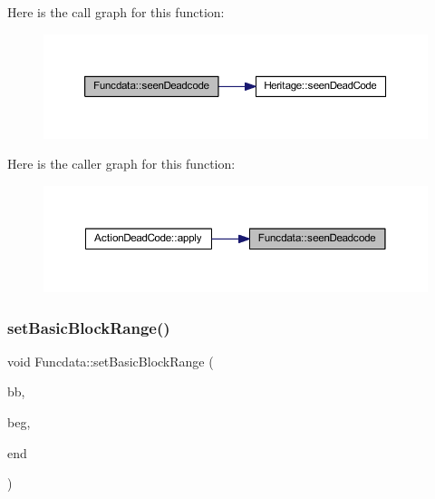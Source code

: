 Here is the call graph for this function\+:
\nopagebreak
\begin{figure}[H]
\begin{center}
\leavevmode
\includegraphics[width=350pt]{class_funcdata_adc0c8b4dab63367913749e68fbd33789_cgraph}
\end{center}
\end{figure}
Here is the caller graph for this function\+:
\nopagebreak
\begin{figure}[H]
\begin{center}
\leavevmode
\includegraphics[width=350pt]{class_funcdata_adc0c8b4dab63367913749e68fbd33789_icgraph}
\end{center}
\end{figure}
\mbox{\label{class_funcdata_a15885a8369e2c43c8c7883a4fabd533e}} 
\subsubsection{\texorpdfstring{setBasicBlockRange()}{setBasicBlockRange()}}
{\footnotesize\ttfamily void Funcdata\+::set\+Basic\+Block\+Range (\begin{DoxyParamCaption}\item[{\mbox{\hyperlink{class_block_basic}{Block\+Basic}} $\ast$}]{bb,  }\item[{const \mbox{\hyperlink{class_address}{Address}} \&}]{beg,  }\item[{const \mbox{\hyperlink{class_address}{Address}} \&}]{end }\end{DoxyParamCaption})\hspace{0.3cm}{\ttfamily [inline]}}



